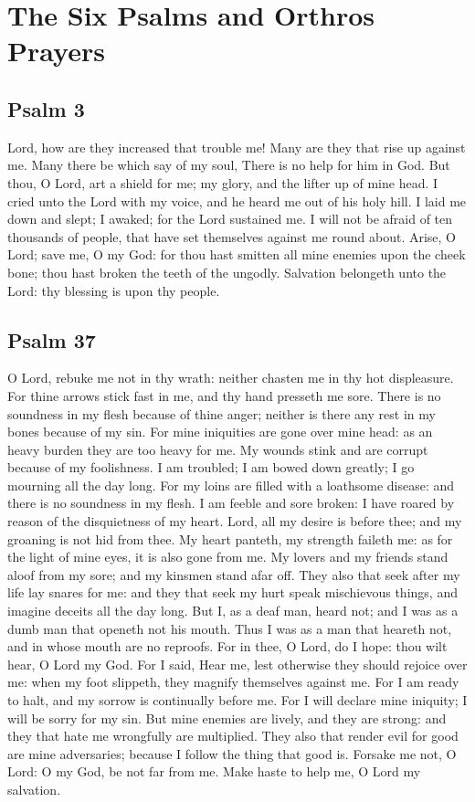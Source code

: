 \section{The Six Psalms and Orthros Prayers}

\subsection{Psalm 3}

Lord, how are they increased that trouble me! Many are they that rise up against me. Many there be which say of my soul, There is no help for him in God. But thou, O Lord, art a shield for me; my glory, and the lifter up of mine head. I cried unto the Lord with my voice, and he heard me out of his holy hill. I laid me down and slept; I awaked; for the Lord sustained me. I will not be afraid of ten thousands of people, that have set themselves against me round about. Arise, O Lord; save me, O my God: for thou hast smitten all mine enemies upon the cheek bone; thou hast broken the teeth of the ungodly. Salvation belongeth unto the Lord: thy blessing is upon thy people.

\subsection{Psalm 37}

O Lord, rebuke me not in thy wrath: neither chasten me in thy hot displeasure. For thine arrows stick fast in me, and thy hand presseth me sore. There is no soundness in my flesh because of thine anger; neither is there any rest in my bones because of my sin. For mine iniquities are gone over mine head: as an heavy burden they are too heavy for me. My wounds stink and are corrupt because of my foolishness. I am troubled; I am bowed down greatly; I go mourning all the day long. For my loins are filled with a loathsome disease: and there is no soundness in my flesh. I am feeble and sore broken: I have roared by reason of the disquietness of my heart. Lord, all my desire is before thee; and my groaning is not hid from thee. My heart panteth, my strength faileth me: as for the light of mine eyes, it is also gone from me. My lovers and my friends stand aloof from my sore; and my kinsmen stand afar off. They also that seek after my life lay snares for me: and they that seek my hurt speak mischievous things, and imagine deceits all the day long. But I, as a deaf man, heard not; and I was as a dumb man that openeth not his mouth. Thus I was as a man that heareth not, and in whose mouth are no reproofs. For in thee, O Lord, do I hope: thou wilt hear, O Lord my God. For I said, Hear me, lest otherwise they should rejoice over me: when my foot slippeth, they magnify themselves against me. For I am ready to halt, and my sorrow is continually before me. For I will declare mine iniquity; I will be sorry for my sin. But mine enemies are lively, and they are strong: and they that hate me wrongfully are multiplied. They also that render evil for good are mine adversaries; because I follow the thing that good is. Forsake me not, O Lord: O my God, be not far from me. Make haste to help me, O Lord my salvation.

